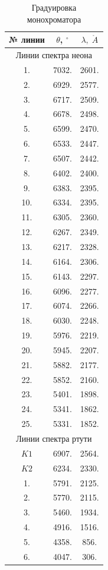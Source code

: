 \documentclass[12pt]{kiarticle}
\begin{document}
	\begin{table}[H]
		\caption{Градуировка монохроматора}
		\begin{center}
			\begin{tabular}{|c|c|c|}
				\hline 
				№  линии & $ \theta $, $ ^\circ $ & $ \lambda, \;\mathring{A} $   \\ 
				\hline 
				\multicolumn{3}{|c|}{Линии спектра неона} \\
				\hline
			 1. & 7032. & 2601. \\
			2. & 6929. & 2577. \\
			3. & 6717. & 2509. \\
			4. & 6678. & 2498. \\
			5. & 6599. & 2470. \\
			6. & 6533. & 2447. \\
			7. & 6507. & 2442. \\
			8. & 6402. & 2400. \\
			9. & 6383. & 2395. \\
			10. & 6334. & 2395. \\
			11. & 6305. & 2360. \\
			12. & 6267. & 2349. \\
			13. & 6217. & 2328. \\
			14. & 6164. & 2306. \\
			15. & 6143. & 2297. \\
			16. & 6096. & 2277. \\
			17. & 6074. & 2266. \\
			18. & 6030. & 2248. \\
			19. & 5976. & 2219. \\
			20. & 5945. & 2207. \\
			21. & 5882. & 2177. \\
			22. & 5852. & 2160. \\
			23. & 5401. & 1898. \\
			24. & 5341. & 1862. \\
			25. & 5331. & 1852. \\
			\hline
				\multicolumn{3}{|c|}{Линии спектра ртути} \\
			\hline
			$ K1 $ & 6907. & 2564. \\
			$ K2 $ & 6234. & 2330. \\
			1. & 5791. & 2125. \\
			2. & 5770. & 2115. \\
			3. & 5460. & 1934. \\
			4. & 4916. & 1516. \\
			5. & 4358. & 856. \\
			6. & 4047. & 306. \\
				\hline 
			\end{tabular} 
		\end{center}
		\label{table g}
	\end{table}
	
\end{document}
